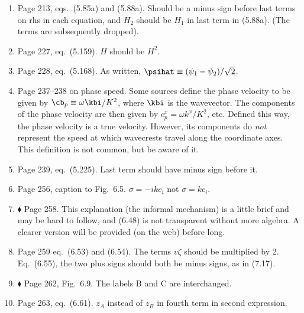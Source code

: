 \documentclass[10pt]{article}
\newcommand{\eq}{eq.\ } \newcommand{\Eq}{Eq.\ }
\renewcommand{\star}{\ensuremath{\blacklozenge} }
\begin{document}
\begin{enumerate}
\item Page 213, eqs.\ (5.85a) and (5.88a). Should be a minus sign before last terms on rhs in each equation, and $H_2$ should be $H_1$ in last term in (5.88a). (The terms are subsequently dropped).  

\item Page 227, \eq (5.159). $H$ should be $H^2$.

\item Page 228, \eq (5.168). As written, $\psihat \equiv (\psi_1 -\psi_2)/\sqrt 2$.

\item Page 237--238 on phase speed. Some sources define the phase velocity to be given by $\cb_p \equiv \omega \kbi / K^2$, where $\kbi$ is the wavevector. The components of the phase velocity are then given by $c^x_p = \omega k^x/K^2$, etc. Defined this way, the phase velocity is a true velocity. However, its components do \emph{not} represent the speed at which wavecrests travel along the coordinate axes. This definition is not common, but be aware of it. 

\item Page 239, \eq (5.225). Last term should have minus sign before it.


\item Page 256, caption to Fig.\ 6.5. $\sigma = -i k c_i$ not $\sigma = kc_i$.


\item \star \label{informal} Page 258. This explanation (the informal mechanism) is a little brief and may be hard to follow, and (6.48) is not transparent without more algebra. A clearer version will be provided (on the web) before long. 

\item Page 259 \eq (6.53) and (6.54). The terms $v \zeta$ should be multiplied by 2. \\ Eq.\ (6.55), the two plus signs should both be minus signs, as in (7.17).

\item \star \label{eadyschem} Page 262, Fig.\ 6.9. The labels {\sf B} and {\sf C} are interchanged.

\item Page 263, \eq (6.61). $z_A$ instead of $z_B$ in fourth term in second expression. 


\end{enumerate}
\end{document}
